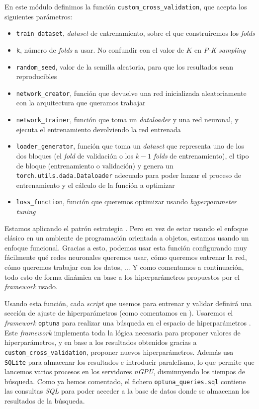 En este módulo definimos la función \lstinline{custom_cross_validation}, que acepta los siguientes parámetros:

\begin{itemize}
    \item \lstinline{train_dataset}, \textit{dataset} de entrenamiento, sobre el que construiremos los \textit{folds}
    \item \lstinline{k}, número de \textit{folds} a usar. No confundir con el valor de $K$ en \textit{P-K sampling}
    \item \lstinline{random_seed}, valor de la semilla aleatoria, para que los resultados sean reproducibles
    \item \lstinline{network_creator}, función que devuelve una red inicializada aleatoriamente con la arquitectura que queramos trabajar
    \item \lstinline{network_trainer}, función que toma un \textit{dataloader} y una red neuronal, y ejecuta el entrenamiento devolviendo la red entrenada
    \item \lstinline{loader_generator}, función que toma un \textit{dataset} que representa uno de los dos bloques (el \textit{fold} de validación o los $k-1$ \textit{folds} de entrenamiento), el tipo de bloque (entrenamiento o validación) y genera un \lstinline{torch.utils.dada.Dataloader} adecuado para poder lanzar el proceso de entrenamiento y el cálculo de la función a optimizar
    \item \lstinline{loss_function}, función que queremos optimizar usando \textit{hyperparameter tuning}
\end{itemize}

Estamos aplicando el patrón estrategia \cite{informatica:design_patterns} \cite{informatica:strategy_pattern_web}. Pero en vez de estar usando el enfoque clásico en un ambiente de programación orientada a objetos, estamos usando un enfoque funcional. Gracias a esto, podemos usar esta función configurando muy fácilmente qué redes neuronales queremos usar, cómo queremos entrenar la red, cómo queremos trabajar con los datos, ... Y como comentamos a continuación, todo esto de forma dinámica en base a los hiperparámetros propuestos por el \textit{framework} usado.

Usando esta función, cada \textit{script} que usemos para entrenar y validar definirá una sección de ajuste de hiperparámetros (como comentamos en ). Usaremos el \textit{framework} \lstinline{optuna} para realizar una búsqueda en el espacio de hiperparámetros \cite{informatica:optuna_web}. Este \textit{framework} implementa toda la lógica necesaria para proponer valores de hiperparámetros, y en base a los resultados obtenidos gracias a \lstinline{custom_cross_validation}, proponer nuevos hiperparámetros. Además usa \lstinline{SQLite} para almacenar los resultados e introducir paralelismo, lo que permite que lancemos varios procesos en los servidores \textit{nGPU}, disminuyendo los tiempos de búsqueda. Como ya hemos comentado, el fichero \lstinline{optuna_queries.sql} contiene las consultas \textit{SQL} para poder acceder a la base de datos donde se almacenan los resultados de la búsqueda.

